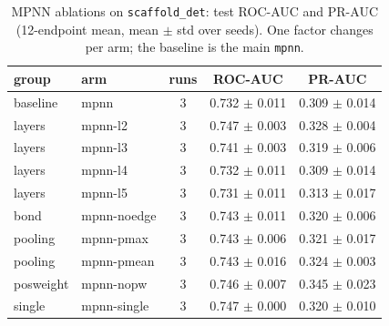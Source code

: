 \begin{table}[t]
\centering
\caption{MPNN ablations on \texttt{scaffold\_det}: test ROC-AUC and PR-AUC (12-endpoint mean, mean $\pm$ std over seeds). One factor changes per arm; the baseline is the main \texttt{mpnn}.}
\label{tab:gnn-ablation}
\scriptsize
\begin{tabular}{llccc}
\toprule
group & arm & runs & ROC-AUC & PR-AUC \\
\midrule
baseline & mpnn & 3 & 0.732 $\pm$ 0.011 & 0.309 $\pm$ 0.014 \\
layers & mpnn-l2 & 3 & 0.747 $\pm$ 0.003 & 0.328 $\pm$ 0.004 \\
layers & mpnn-l3 & 3 & 0.741 $\pm$ 0.003 & 0.319 $\pm$ 0.006 \\
layers & mpnn-l4 & 3 & 0.732 $\pm$ 0.011 & 0.309 $\pm$ 0.014 \\
layers & mpnn-l5 & 3 & 0.731 $\pm$ 0.011 & 0.313 $\pm$ 0.017 \\
bond & mpnn-noedge & 3 & 0.743 $\pm$ 0.011 & 0.320 $\pm$ 0.006 \\
pooling & mpnn-pmax & 3 & 0.743 $\pm$ 0.006 & 0.321 $\pm$ 0.017 \\
pooling & mpnn-pmean & 3 & 0.743 $\pm$ 0.016 & 0.324 $\pm$ 0.003 \\
posweight & mpnn-nopw & 3 & 0.746 $\pm$ 0.007 & 0.345 $\pm$ 0.023 \\
single & mpnn-single & 3 & 0.747 $\pm$ 0.000 & 0.320 $\pm$ 0.010 \\
\bottomrule
\end{tabular}
\end{table}
